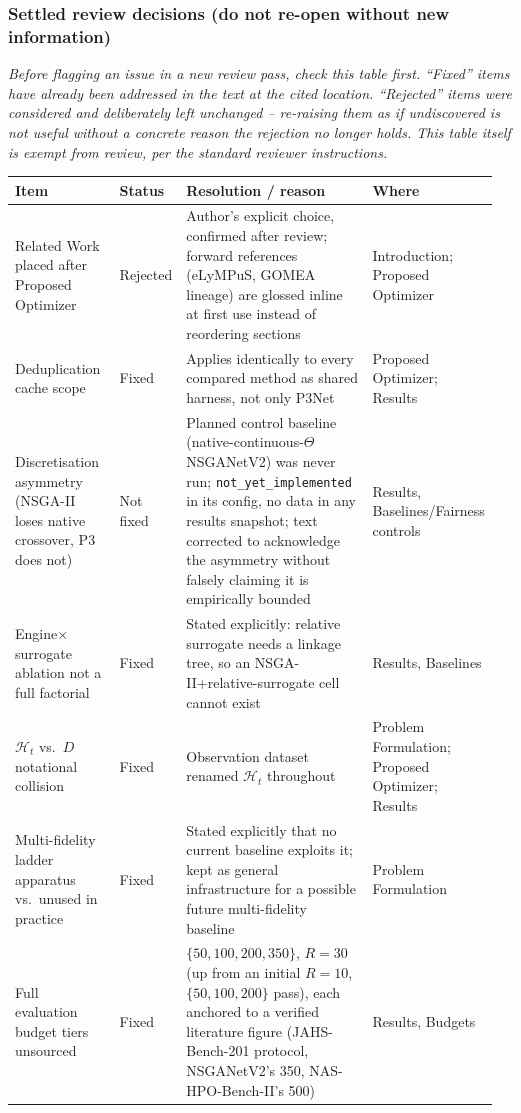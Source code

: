 \subsubsection*{Settled review decisions (do not re-open without new information)}
\emph{Before flagging an issue in a new review pass, check this table first. ``Fixed'' items have already
been addressed in the text at the cited location. ``Rejected'' items were considered and deliberately left
unchanged -- re-raising them as if undiscovered is not useful without a concrete reason the rejection no
longer holds. This table itself is exempt from review, per the standard reviewer instructions.}
\begin{longtable}{p{0.24\linewidth} p{0.08\linewidth} p{0.55\linewidth} p{0.09\linewidth}}
\toprule
\textbf{Item} & \textbf{Status} & \textbf{Resolution / reason} & \textbf{Where} \\
\midrule
\endhead
Related Work placed after Proposed Optimizer & Rejected & Author's explicit choice, confirmed after review; forward references (eLyMPuS, GOMEA lineage) are glossed inline at first use instead of reordering sections & Introduction; Proposed Optimizer \\
Deduplication cache scope & Fixed & Applies identically to every compared method as shared harness, not only P3Net & Proposed Optimizer; Results \\
Discretisation asymmetry (NSGA-II loses native crossover, P3 does not) & Not fixed & Planned control baseline (native-continuous-$\Theta$ NSGANetV2) was never run; \texttt{not\_yet\_implemented} in its config, no data in any results snapshot; text corrected to acknowledge the asymmetry without falsely claiming it is empirically bounded & Results, Baselines/Fairness controls \\
Engine$\times$surrogate ablation not a full factorial & Fixed & Stated explicitly: relative surrogate needs a linkage tree, so an NSGA-II+relative-surrogate cell cannot exist & Results, Baselines \\
$\mathcal{H}_t$ vs.\ $D$ notational collision & Fixed & Observation dataset renamed $\mathcal{H}_t$ throughout & Problem Formulation; Proposed Optimizer; Results \\
Multi-fidelity ladder apparatus vs.\ unused in practice & Fixed & Stated explicitly that no current baseline exploits it; kept as general infrastructure for a possible future multi-fidelity baseline & Problem Formulation \\
Full evaluation budget tiers unsourced & Fixed & $\{50,100,200,350\}$, $R=30$ (up from an initial $R=10$, $\{50,100,200\}$ pass), each anchored to a verified literature figure (JAHS-Bench-201 protocol, NSGANetV2's 350, NAS-HPO-Bench-II's 500) & Results, Budgets \\

\end{longtable}
